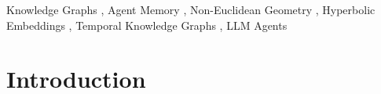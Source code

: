 \documentclass[hf]{ceurart}
\begin{document}
\begin{keywords}
  Knowledge Graphs \sep
  Agent Memory \sep
  Non-Euclidean Geometry \sep
  Hyperbolic Embeddings \sep
  Temporal Knowledge Graphs \sep
  LLM Agents
\end{keywords}

\maketitle


\section{Introduction}
\end{document}
